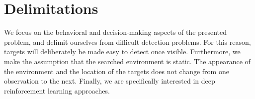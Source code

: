 \section{Delimitations}
\label{sec:delimitations}

We focus on the behavioral and decision-making aspects of the presented problem, and delimit ourselves from difficult detection problems.
For this reason, targets will deliberately be made easy to detect once visible.
Furthermore, we make the assumption that the searched environment is static.
The appearance of the environment and the location of the targets does not change from one observation to the next.
Finally, we are specifically interested in deep reinforcement learning approaches.

